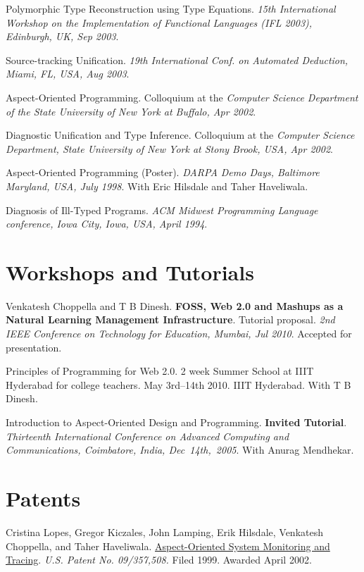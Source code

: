 \documentclass[11pt,margin,line]{res}
\begin{document}
\begin{resume}
Polymorphic Type Reconstruction using Type
Equations.   {\em {15th  International
Workshop on the Implementation of Functional Languages (IFL
2003), Edinburgh, UK, Sep 2003}}.

Source-tracking Unification.  {\em {19th  International
Conf. on Automated Deduction, Miami, FL, USA, Aug 2003}}.

Aspect-Oriented Programming.  Colloquium at the {\em
{Computer Science Department of the State University of New
York at Buffalo, Apr 2002}}.

Diagnostic Unification and Type Inference.  Colloquium at
the {\em {Computer Science Department, State University of
New York at Stony Brook, USA, Apr 2002}}.

Aspect-Oriented Programming (Poster).  {\em {DARPA Demo
Days, Baltimore Maryland, USA, July 1998}}.  With Eric
Hilsdale and Taher Haveliwala.

Diagnosis of Ill-Typed Programs. {\em {ACM Midwest
Programming Language conference, Iowa City, Iowa, USA, April
1994}}.


\section{\sc Workshops and Tutorials}


Venkatesh Choppella and T B Dinesh.  {\bf FOSS, Web 2.0 and
  Mashups as a Natural Learning Management Infrastructure}.
Tutorial proposal.  {\em 2nd IEEE Conference on Technology
  for Education, Mumbai, Jul 2010}.  Accepted for
presentation.

Principles of Programming for Web 2.0.  2 week Summer School
at IIIT Hyderabad for college teachers.  May 3rd--14th 2010.
IIIT Hyderabad.  With T B Dinesh.

Introduction to Aspect-Oriented Design and Programming.
{\bf Invited Tutorial}.  {\em Thirteenth International
  Conference on Advanced Computing and Communications,
  Coimbatore, India, Dec~14th,~2005}.  With Anurag
Mendhekar.




\section{\sc Patents}

Cristina Lopes, Gregor Kiczales, John Lamping, Erik Hilsdale,
Venkatesh Choppella, and Taher Haveliwala.
\href{http://www.patentstorm.us/patents/6473895.html}
{Aspect-Oriented System Monitoring and Tracing}.  {\em {U.S.
    Patent No. 09/357,508.}} Filed 1999. Awarded April 2002.


\end{resume}
\end{document}

